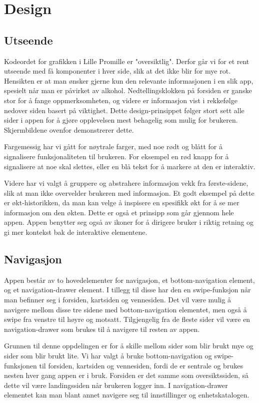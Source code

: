 \documentclass[12pt]{article}
\begin{document}
\section{Design}
\subsection{Utseende}
Kodeordet for grafikken i Lille Promille er "oversiktlig". Derfor går vi for et rent utseende med få komponenter i hver side, slik at det ikke blir for mye rot. Hensikten er at man ønsker gjerne kun den relevante informasjonen i en slik app, spesielt når man er påvirket av alkohol. Nedtellingsklokken på forsiden er ganske stor for å fange oppmerksomheten, og videre er informasjon vist i rekkefølge nedover siden basert på viktighet. Dette design-prinsippet følger stort sett alle sider i appen for å gjøre opplevelsen mest behagelig som mulig for brukeren. Skjermbildene ovenfor demonstrerer dette.

Fargemessig har vi gått for nøytrale farger, med noe rødt og blått for å signalisere funksjonaliteten til brukeren. For eksempel en rød knapp for å signalisere at noe skal slettes, eller en blå tekst for å markere at den er interaktiv.

Videre har vi valgt å gruppere og abstrahere informasjon vekk fra første-sidene, slik at man ikke overvelder brukeren med informasjon. Et godt eksempel på dette er økt-historikken, da man kan velge å inspisere en spesifikk økt for å se mer informasjon om den økten. Dette er også et prinsipp som går gjennom hele appen. Appen benytter seg også av ikoner for å dirigere bruker i riktig retning og gi mer kontekst bak de interaktive elementene.

\subsection{Navigasjon}
Appen består av to hovedelementer for navigasjon, et bottom-navigation element, og et navigation-drawer element. I tillegg til disse har den en swipe-funksjon når man befinner seg i forsiden, kartsiden og vennesiden. Det vil være mulig å navigere mellom disse tre sidene med bottom-navigation elementet, men også å swipe fra venstre til høyre og motsatt. Tilgjengelig fra de fleste sider vil være en navigation-drawer som brukes til å navigere til resten av appen.

Grunnen til denne oppdelingen er for å skille mellom sider som blir brukt mye og sider som blir brukt lite. Vi har valgt å bruke bottom-navigation og swipe-funksjonen til forsiden, kartsiden og vennesiden, fordi de er sentrale og brukes nesten hver gang appen er i bruk. Forsiden er det samme som oversiktssiden, så dette vil være landingssiden når brukeren logger inn. I navigation-drawer elementet kan man blant annet navigere seg til innstillinger og enhetskatalogen.
\end{document}
